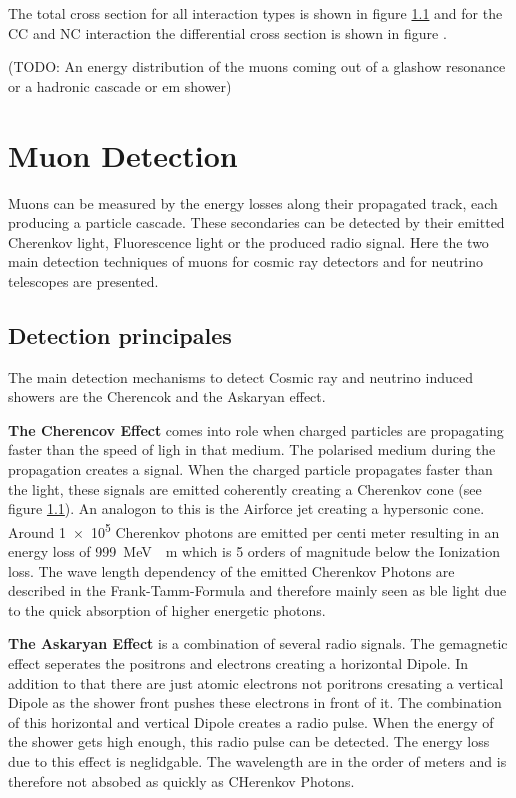 The total cross section for all interaction types is shown in figure \ref{} and for the CC and NC interaction the differential cross section is shown in figure {}.

(TODO: An energy distribution of the muons coming out of a glashow resonance or a hadronic cascade or em shower)

\chapter{Muon Detection}

Muons can be measured by the energy losses along their propagated track, each producing a particle cascade.
These secondaries can be detected by their emitted Cherenkov light, Fluorescence light or the produced radio signal.
Here the two main detection techniques of muons for cosmic ray detectors and for neutrino telescopes are presented.

\section{Detection principales}

The main detection mechanisms to detect Cosmic ray and neutrino induced showers are the Cherencok and the Askaryan effect.

\textbf{The Cherencov Effect} comes into role when charged particles are propagating faster than the speed of ligh in that medium.
The polarised medium during the propagation creates a signal.
When the charged particle propagates faster than the light, these signals are emitted coherently creating a Cherenkov cone (see figure \ref{}).
An analogon to this is the Airforce jet creating a hypersonic cone.
Around \num{1e5} Cherenkov photons are emitted per centi meter resulting in an energy loss of \SI{999}{MeV.\per.m} which is 5 orders of magnitude below the Ionization loss.
The wave length dependency of the emitted Cherenkov Photons are described in the Frank-Tamm-Formula and therefore mainly seen as ble light due to the quick absorption of higher energetic photons.


\textbf{The Askaryan Effect} is a combination of several radio signals.
The gemagnetic effect seperates the positrons and electrons creating a horizontal Dipole.
In addition to that there are just atomic electrons not poritrons cresating a vertical Dipole as the shower front pushes these electrons in front of it.
The combination of this horizontal and vertical Dipole creates a radio pulse.
When the energy of the shower gets high enough, this radio pulse can be detected.
The energy loss due to this effect is neglidgable.
The wavelength are in the order of meters and is therefore not absobed as quickly as CHerenkov Photons.


